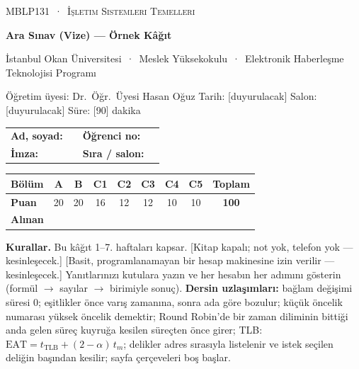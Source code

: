 \thispagestyle{empty}
\begin{tcolorbox}[enhanced,colback=dark,colframe=dark,arc=0pt,boxrule=0pt,
  left=18pt,right=18pt,top=14pt,bottom=14pt,coltext=white]
{\small\color{mint}\textsc{MBLP131 \,·\, İşletim Sistemleri Temelleri}}\par\smallskip
{\headfont\fontsize{22}{26}\selectfont\bfseries Ara Sınav (Vize) --- Örnek Kâğıt}\par\smallskip
{\small İstanbul Okan Üniversitesi \,·\, Meslek Yüksekokulu \,·\, Elektronik Haberleşme Teknolojisi Programı}\par
{\small Öğretim üyesi: Dr.\ Öğr.\ Üyesi Hasan Oğuz \quad Tarih: [duyurulacak] \quad Salon: [duyurulacak] \quad Süre: [90] dakika}
\end{tcolorbox}

\begin{center}
\renewcommand{\arraystretch}{1.6}
\begin{tabularx}{\linewidth}{@{}lX lX@{}}
\textbf{Ad, soyad:} & \hrulefill & \textbf{Öğrenci no:} & \hrulefill \\
\textbf{İmza:} & \hrulefill & \textbf{Sıra / salon:} & \hrulefill \\
\end{tabularx}

\vspace{0.4em}
\renewcommand{\arraystretch}{1.35}
\begin{tabular}{|l|c|c|c|c|c|c|c|c|}
\hline
\textbf{Bölüm} & A & B & C1 & C2 & C3 & C4 & C5 & \textbf{Toplam} \\ \hline
\textbf{Puan} & 20 & 20 & 16 & 12 & 12 & 10 & 10 & \textbf{100} \\ \hline
\textbf{Alınan} & & & & & & & & \\[0.4em] \hline
\end{tabular}
\end{center}

\textbf{Kurallar.} Bu kâğıt 1--7. haftaları kapsar. [Kitap kapalı; not yok, telefon yok --- kesinleşecek.] [Basit, programlanamayan bir hesap makinesine izin verilir --- kesinleşecek.] Yanıtlarınızı kutulara yazın ve her hesabın her adımını gösterin (formül $\to$ sayılar $\to$ birimiyle sonuç). \textbf{Dersin uzlaşımları:} bağlam değişimi süresi $0$; eşitlikler önce varış zamanına, sonra ada göre bozulur; küçük öncelik numarası yüksek öncelik demektir; Round Robin'de bir zaman diliminin bittiği anda gelen süreç kuyruğa kesilen süreçten önce girer; TLB: $\text{EAT} = t_{\text{TLB}} + (2-\alpha)\,t_m$; delikler adres sırasıyla listelenir ve istek seçilen deliğin başından kesilir; sayfa çerçeveleri boş başlar.

